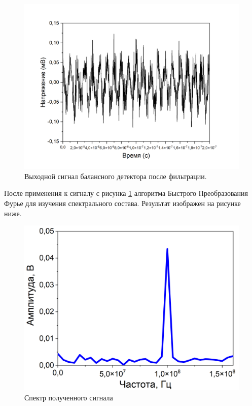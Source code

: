 \begin{figure}
    \centering
    \includegraphics[width=\linewidth]{images/сигнал после бд с новыми шкалами.png}
    \caption{Выходной сигнал балансного детектора после фильтрации.}
    \label{fig:filter 100 mhz ch2}
\end{figure}
После применения к сигналу с рисунка \ref{fig:filter 100 mhz ch2} алгоритма Быстрого Преобразования Фурье для изучения спектрального состава. Результат изображен на рисунке ниже.
\begin{figure}
    \centering
    \includegraphics[width=\linewidth]{images/05.png}
    \caption{Спектр полученного сигнала}
    \label{fig:spectrum ch2}
\end{figure}
